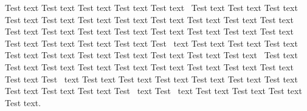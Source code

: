 \documentclass[animals,article,accept,moreauthors,pdftex]{Definitions/mdpi}
\begin{document}
Test text Test text Test text Test text Test text~\cite{B1-animals-4264543} Test text Test text Test text Test text Test text Test text Test text Test text Test text Test text Test text Test text Test text Test text Test text Test text Test text Test text Test text Test text Test text Test text Test text Test~\cite{B2-animals-4264543} text Test text Test text Test text Test text Test text Test text Test text Test text Test text Test text~\cite{B3-animals-4264543} Test text Test text Test text Test text Test text Test text Test text Test text Test text Test text Test~\cite{B4-animals-4264543} text Test text Test text Test text Test text Test text Test text Test text Test text Test text Test~\cite{B5-animals-4264543} text Test~\cite{B6-animals-4264543} text Test text Test text Test text Test text.

\vspace{6pt}

\appendixstart
\appendix
\end{document}
